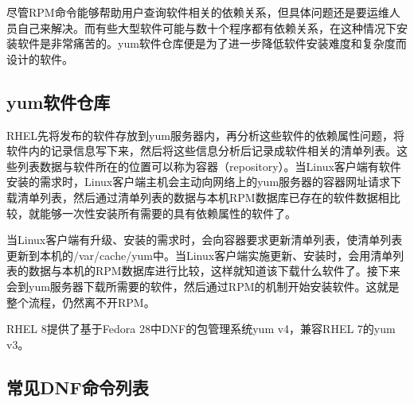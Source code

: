 \documentclass[12pt,UTF8]{ctexbook}
\begin{document}
尽管RPM命令能够帮助用户查询软件相关的依赖关系，但具体问题还是要运维人员自己来解决。而有些大型软件可能与数十个程序都有依赖关系，在这种情况下安装软件是非常痛苦的。yum软件仓库便是为了进一步降低软件安装难度和复杂度而设计的软件。

\subsection{yum软件仓库}

RHEL先将发布的软件存放到yum服务器内，再分析这些软件的依赖属性问题，将软件内的记录信息写下来，然后将这些信息分析后记录成软件相关的清单列表。这些列表数据与软件所在的位置可以称为容器（repository）。当Linux客户端有软件安装的需求时，Linux客户端主机会主动向网络上的yum服务器的容器网址请求下载清单列表，然后通过清单列表的数据与本机RPM数据库已存在的软件数据相比较，就能够一次性安装所有需要的具有依赖属性的软件了。

当Linux客户端有升级、安装的需求时，会向容器要求更新清单列表，使清单列表更新到本机的/var/cache/yum中。当Linux客户端实施更新、安装时，会用清单列表的数据与本机的RPM数据库进行比较，这样就知道该下载什么软件了。接下来会到yum服务器下载所需要的软件，然后通过RPM的机制开始安装软件。这就是整个流程，仍然离不开RPM。

RHEL 8提供了基于Fedora 28中DNF的包管理系统yum v4，兼容RHEL 7的yum v3。

\subsection{常见DNF命令列表}
\end{document}
